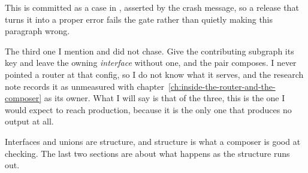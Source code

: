 This is committed as a case in , asserted by the
crash message, so a release that turns it into a proper error fails the gate
rather than quietly making this paragraph wrong.

%
The third one I mention and did not chase. Give the contributing subgraph its key
and leave the owning \emph{interface} without one, and the pair composes. I never
pointed a router at that config, so I do not know what it serves, and the
research note records it as unmeasured with
chapter~\ref{ch:inside-the-router-and-the-composer} as its owner. What I will say
is that of the three, this is the one I would expect to reach production, because
it is the only one that produces no output at all.

\medskip
Interfaces and unions are structure, and structure is what a composer is good at
checking. The last two sections are about what happens as the structure runs out.

%
%
